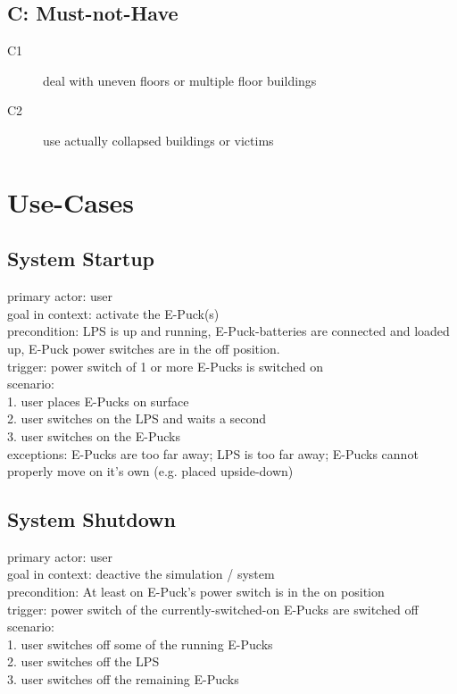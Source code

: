 \documentclass[a4paper,parskip,headheight=38pt]{scrartcl} %
\begin{document}
\subsection*{C: Must-not-Have}
\begin{description}
\item[C1] deal with uneven floors or multiple floor buildings
\item[C2] use actually collapsed buildings or victims
\end{description}


\section{Use-Cases}
\subsection{System Startup}
primary actor: user \\
goal in context: activate the E-Puck(s) \\
precondition: LPS is up and running, E-Puck-batteries are connected and loaded up, E-Puck power switches are in the off position. \\
trigger: power switch of 1 or more E-Pucks is switched on \\
scenario: \\
1. user places E-Pucks on surface \\
2. user switches on the LPS and waits a second \\
3. user switches on the E-Pucks \\
exceptions: E-Pucks are too far away; LPS is too far away; E-Pucks cannot properly move on it's own (e.g. placed upside-down) \\

\subsection{System Shutdown}
primary actor: user \\
goal in context: deactive the simulation / system \\
precondition: At least on E-Puck's power switch is in the on position \\
trigger: power switch of the currently-switched-on E-Pucks are switched off \\
scenario: \\
1. user switches off some of the running E-Pucks \\
2. user switches off the LPS \\
3. user switches off the remaining E-Pucks \\
\end{document}
